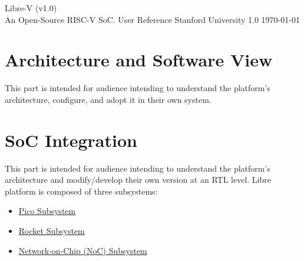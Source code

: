 \documentclass[9pt,a4paper]{report}
\begin{document}
\renewcommand{\docShortTitle}{Technical Reference Manual}
\renewcommand{\docCode}{Stanford University}
\newcommand{\aytooc}{I\textsuperscript{2}C}

\makeCoverPage
  {Libre-V (v1.0)\\ {\LARGE An Open-Source RISC-V SoC.}}
  {User Reference}
  {Stanford University}
  {1.0}
  {\today}



\tableofcontents
\listoffigures
\listoftables

\clearpage
{}

\part{Architecture and Software View}

This part is intended for audience intending to understand the platform's architecture, configure, and adopt it in their own system. 



% 


% 
% 
% 


\part{SoC Integration} 
This part is intended for audience intending to understand the platform's architecture and modify/develop their own version at an RTL level. Libre platform is composed of three subsystems:
\begin{itemize}
  \item \hyperref[ch:hw-pico-sys]{Pico Subsystem}
  \item \hyperref[ch:hw-rocket-sys]{Rocket Subsystem}
  \item \hyperref[ch:hw-noc-sys]{Network-on-Chip (NoC) Subsystem}
\end{itemize} 




% 
% 


\end{document}
